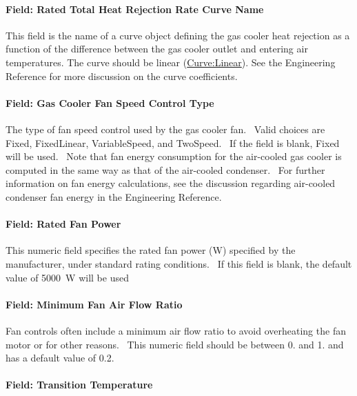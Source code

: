 \paragraph{Field: Rated Total Heat Rejection Rate Curve Name}\label{field-rated-total-heat-rejection-rate-curve-name}

This field is the name of a curve object defining the gas cooler heat rejection as a function of the difference between the gas cooler outlet and entering air temperatures. The curve should be linear (\hyperref[curvelinear]{Curve:Linear}). See the Engineering Reference for more discussion on the curve coefficients.

\paragraph{Field: Gas Cooler Fan Speed Control Type}\label{field-gas-cooler-fan-speed-control-type}

The type of fan speed control used by the gas cooler fan.~ Valid choices are Fixed, FixedLinear, VariableSpeed, and TwoSpeed.~ If the field is blank, Fixed will be used.~ Note that fan energy consumption for the air-cooled gas cooler is computed in the same way as that of the air-cooled condenser.~ For further information on fan energy calculations, see the discussion regarding air-cooled condenser fan energy in the Engineering Reference.

\paragraph{Field: Rated Fan Power}\label{field-rated-fan-power-2}

This numeric field specifies the rated fan power (W) specified by the manufacturer, under standard rating conditions.~ If this field is blank, the default value of 5000~W will be used

\paragraph{Field: Minimum Fan Air Flow Ratio}\label{field-minimum-fan-air-flow-ratio-2}

Fan controls often include a minimum air flow ratio to avoid overheating the fan motor or for other reasons.~ This numeric field should be between 0. and 1. and has a default value of 0.2.

\paragraph{Field: Transition Temperature}\label{field-transition-temperature}


